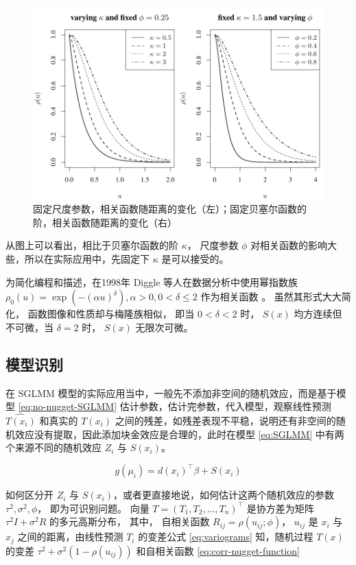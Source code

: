 \documentclass[12pt,a4paper,UTF8,twoside]{book}
\theoremstyle{definition}
\theoremstyle{definition}
\theoremstyle{definition}
\theoremstyle{remark}
\begin{document}
\begin{figure}

{\centering \includegraphics[width=0.7\linewidth]{figures/matern} 

}

\caption{固定尺度参数，相关函数随距离的变化（左）；固定贝塞尔函数的阶，相关函数随距离的变化（右）}\label{fig:matern-2d}
\end{figure}

从图上可以看出，相比于贝塞尔函数的阶 \(\kappa\)， 尺度参数 \(\phi\)
对相关函数的影响大些，所以在实际应用中，先固定下 \(\kappa\)
是可以接受的。

为简化编程和描述，在1998年 Diggle 等人在数据分析中使用幂指数族
\(\rho_{0}(u) = \exp(-(\alpha u)^{\delta}), \alpha > 0, 0 < \delta \leq 2\)
作为相关函数 \citep{Diggle1998}。 虽然其形式大大简化，
函数图像和性质却与梅隆族相似， 即当 \(0 < \delta < 2\) 时， \(S(x)\)
均方连续但不可微，当 \(\delta = 2\) 时， \(S(x)\) 无限次可微。

\hypertarget{identify}{%
\subsection{模型识别}\label{identify}}

在 SGLMM 模型的实际应用当中，一般先不添加非空间的随机效应，而是基于模型
\eqref{eq:no-nugget-SGLMM} 估计参数，估计完参数，代入模型，观察线性预测
\(\hat{T(x_{i})}\) 和真实的 \(T(x_i)\)
之间的残差，如残差表现不平稳，说明还有非空间的随机效应没有提取，因此添加块金效应是合理的，此时在模型
\eqref{eq:SGLMM} 中有两个来源不同的随机效应 \(Z_{i}\) 与 \(S(x_i)\)。

\begin{equation}
g(\mu_i) = d(x_i)^{\top}\beta + S(x_i) \label{eq:no-nugget-SGLMM}
\end{equation}

如何区分开 \(Z_{i}\) 与
\(S(x_i)\)，或者更直接地说，如何估计这两个随机效应的参数
\(\tau^2, \sigma^2, \phi\)， 即为可识别问题。 向量
\(T = (T_1,T_2,\ldots,T_n)^{\top}\) 是协方差为矩阵
\(\tau^2I + \sigma^2R\) 的多元高斯分布， 其中， 自相关函数
\(R_{ij} = \rho(u_{ij}; \phi)\)， \(u_{ij}\) 是 \(x_i\) 与 \(x_j\)
之间的距离，由线性预测 \(T_{i}\) 的变差公式 \eqref{eq:variograms}
知，随机过程 \(T(x)\) 的变差 \(\tau^2 + \sigma^2(1-\rho(u_{ij}))\)
和自相关函数 \eqref{eq:corr-nugget-function}
\end{document}
